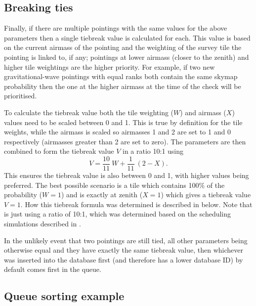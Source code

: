 
\subsection{Breaking ties}
\label{sec:breaking_ties}
\begin{colsection}

Finally, if there are multiple pointings with the same values for the above parameters then a single tiebreak value is calculated for each. This value is based on the current airmass of the pointing and the weighting of the survey tile the pointing is linked to, if any; pointings at lower airmass (closer to the zenith) and higher tile weightings are the higher priority. For example, if two new gravitational-wave pointings with equal ranks both contain the same skymap probability then the one at the higher airmass at the time of the check will be prioritised.

To calculate the tiebreak value both the tile weighting ($W$) and airmass ($X$) values need to be scaled between 0 and 1. This is true by definition for the tile weights, while the airmass is scaled so airmasses 1 and 2 are set to 1 and 0 respectively (airmasses greater than 2 are set to zero). The parameters are then combined to form the tiebreak value $V$ in a ratio 10:1 using
%
\begin{equation}
    V = \frac{10}{11}~W + \frac{1}{11}~(2 - X).
    \label{eq:tiebreak}
\end{equation}
%
This ensures the tiebreak value is also between 0 and 1, with higher values being preferred. The best possible scenario is a tile which contains 100\% of the probability ($W=1$) and is exactly at zenith ($X=1$) which gives a tiebreak value $V=1$. How this tiebreak formula was determined is described in  below. Note that  is just  using a ratio of 10:1, which was determined based on the scheduling simulations described in .

In the unlikely event that two pointings are still tied, all other parameters being otherwise equal and they have exactly the same tiebreak value, then whichever was inserted into the database first (and therefore has a lower database ID) by default comes first in the queue.

\end{colsection}


\subsection{Queue sorting example}
\label{sec:sorting_example}

